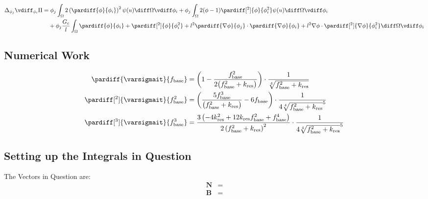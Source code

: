 \documentclass{mitschrift}
\begin{document}
\begin{align}
    \Delta_{\phi_j} \vdiff_{\phi_i} \Pi &= \phi_j \int_\Omega 2\left(\pardiff{\phi}{\phi_i}\right)^2 \psi(u) \diff \Omega \vdiff \phi_i 
    + \phi_j \int_\Omega 2(\phi -1 )\pardiff[^2]{\phi}{\phi_i^2} \psi(u) \diff \Omega \vdiff \phi_i \\
&\phantom{={}} +\phi_j \frac{G_c}{l} \int_\Omega \pardiff{\phi}{\phi_i} + \pardiff[^2]{\phi}{\phi_i^2} + l^2 \pardiff{\nabla \phi}{\phi_j} \cdot \pardiff{\nabla \phi}{\phi_i} + l^2 \nabla \phi \cdot \pardiff[^2]{\nabla \phi}{\phi_i^2} \diff \Omega \vdiff \phi_i
\end{align}

\subsection{Numerical Work}

\begin{align} %
    \pardiff{\varsigmait}{f_{\text{base}}} &= \biggl(1 - \frac{f_{\text{base}}^2}{2\bigl(f_{\text{base}}^2 + k_{\text{res}}\bigr)}\biggr) \cdot \frac{1}{\sqrt[4]{f_{\text{base}}^2 + k_{\text{res}}}}\\
    \pardiff[^2]{\varsigmait}{f_{\text{base}}^2} &= \biggl(\frac{5f_{\text{base}}^3}{\bigl(f_{\text{base}}^2 + k_{\text{res}}\bigr)} - 6 f_{\text{base}}\biggr) \cdot \frac{1}{4 {\sqrt[4]{f_{\text{base}}^2 + k_{\text{res}}}}^5}\\
    \pardiff[^3]{\varsigmait}{f_{\text{base}}^3}&= \frac{3\left(-4k_{\text{res}}^{2}+12k_{\text{res}}f_{\text{base}}^{2}+f_{\text{base}}^{4}\right)}{2\left(f_{\text{base}}^{2}+k_{\text{res}}\right)^{2}}\cdot\frac{1}{4{\sqrt[4]{f_{\text{base}}^2 + k_{\text{res}}}}^5}
\end{align}

\subsection{Setting up the Integrals in Question}

The Vectors in Question are:
\begin{align}
    \boldsymbol{N} &= \\
    \boldsymbol{B} &= 
\end{align}
\end{document}
